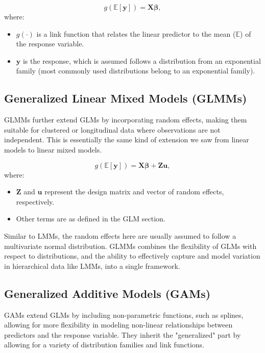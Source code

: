 \documentclass[12pt, twoside,hidelinks]{article}
\theoremstyle{definition}
\numberwithin{equation}{section}
\begin{document}
\begin{equation}
    g(\mathbb{E}[\mathbf{y}]) = \mathbf{X}\boldsymbol{\beta},
    \label{eq:glm_general_form}
\end{equation}
where:
\begin{itemize}
    \item \( g(\cdot) \) is a link function that relates the linear predictor to the mean (\(\mathbb{E}\)) of the response variable.
    \item \( \boldsymbol{y} \) is the response, which is assumed follows a distribution from an exponential family (most commonly used distributions belong to an exponential family).
\end{itemize}

\subsection{Generalized Linear Mixed Models (GLMMs)}\label{sec:regmod:glmm}

GLMMs further extend GLMs by incorporating random effects, making them suitable for clustered or longitudinal data where observations are not independent. This is essentially the same kind of extension we saw from linear models to linear mixed models. 

\begin{equation}
    g(\mathbb{E}[\mathbf{y}]) = \mathbf{X}\boldsymbol{\beta} + \mathbf{Z}\boldsymbol{u},
    \label{eq:glmm_general_form}
\end{equation}
where:
\begin{itemize}
    \item \( \mathbf{Z} \) and \( \boldsymbol{u} \) represent the design matrix and vector of random effects, respectively.
    \item Other terms are as defined in the GLM section.
\end{itemize}

Similar to LMMs, the random effects here are usually assumed to follow a multivariate normal distribution. GLMMs combines the flexibility of GLMs with respect to distributions, and the ability to effectively capture and model variation in hierarchical data like LMMs, into a single framework. 

\subsection{Generalized Additive Models (GAMs)}\label{sec:regmod:gam}

GAMs extend GLMs by including non-parametric functions, such as splines, allowing for more flexibility in modeling non-linear relationships between predictors and the response variable. They inherit the "generalized" part by allowing for a variety of distribution families and link functions. 
\end{document}

